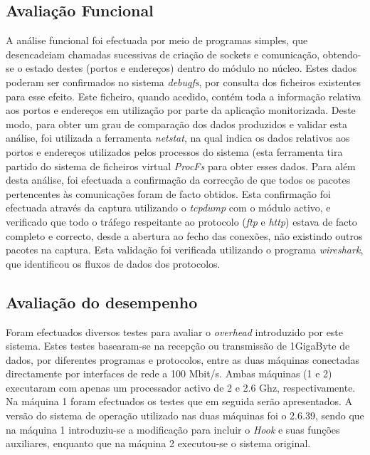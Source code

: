 \documentclass[a4paper]{llncs}
\newcommand{\td}[1]{\todo[inline]{#1}}
\begin{document}
\subsection{Avaliação Funcional}
A análise funcional foi efectuada por meio de programas simples, que desencadeiam chamadas sucessivas de criação de sockets e comunicação, obtendo-se o estado destes (portos e endereços) dentro do módulo no núcleo.
 Estes dados poderam ser confirmados no sistema \textit{debugfs}, por consulta dos ficheiros existentes para esse efeito. Este ficheiro, quando acedido, contém toda a informação relativa aos portos e endereços em utilização por parte da aplicação monitorizada.
 Deste modo, para obter um grau de comparação dos dados produzidos e validar esta análise, foi utilizada a ferramenta \textit{netstat}, na qual indica os dados relativos aos portos e endereços utilizados pelos processos do sistema (esta ferramenta tira partido do sistema de ficheiros virtual \textit{ProcFs} para obter esses dados.
 Para além desta análise, foi efectuada a confirmação da correcção de que todos os pacotes pertencentes às comunicações foram de facto obtidos.
 Esta confirmação foi efectuada através da captura utilizando o \textit{tcpdump} com o módulo activo, e verificado que todo o tráfego respeitante ao protocolo (\textit{ftp} e \textit{http}) estava de facto completo e correcto, desde a abertura ao fecho das conexões, não existindo outros pacotes na captura.
 Esta validação foi verificada utilizando o programa \textit{wireshark}, que identificou os fluxos de dados dos protocolos.

\subsection{Avaliação do desempenho}
Foram efectuados diversos testes para avaliar o \emph{overhead} introduzido por este sistema.
 Estes testes basearam-se na recepção ou transmissão de 1GigaByte de dados, por diferentes programas e protocolos, entre as duas máquinas conectadas directamente por interfaces de rede a 100 Mbit/s.
 Ambas máquinas (1 e 2) executaram com apenas um processador activo de 2 e 2.6 Ghz, respectivamente.
 Na máquina 1 foram efectuados os testes que em seguida serão apresentados.
 A versão do sistema de operação utilizado nas duas máquinas foi o 2.6.39, sendo que na máquina 1 introduziu-se a modificação para incluir o \textit{Hook} e suas funções auxiliares, enquanto que na máquina 2 executou-se o sistema original.
\end{document}
